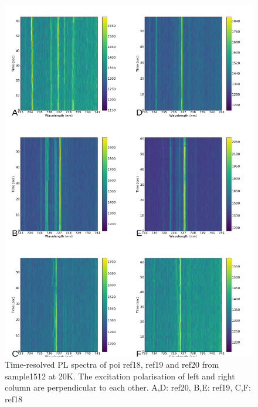 \begin{figure}[h]
\centering
\includegraphics[width=1\linewidth]{Figures/pic/hydrogenterminationtimeresolve}
\caption{Time-resolved PL spectra of poi ref18, ref19 and ref20 from sample1512 at 20K. The excitation polarisation of left and right column are perpendicular to each other.
A,D: ref20, B,E: ref19, C,F: ref18}
\label{fig:hydrogenterminationtimeresolve}
\end{figure}


